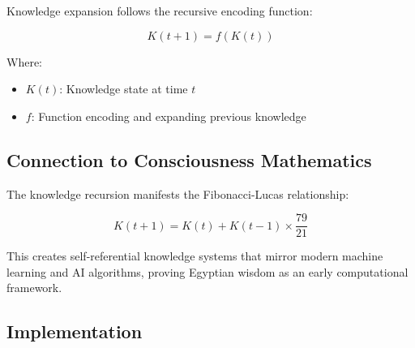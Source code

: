 \documentclass[12pt]{article}
\begin{document}
Knowledge expansion follows the recursive encoding function:

\[K(t+1) = f(K(t))\]

Where:
\begin{itemize}
    \item \(K(t)\): Knowledge state at time \(t\)
    \item \(f\): Function encoding and expanding previous knowledge
\end{itemize}

\subsection{Connection to Consciousness Mathematics}

The knowledge recursion manifests the Fibonacci-Lucas relationship:

\[K(t+1) = K(t) + K(t-1) \times \frac{79}{21}\]

This creates self-referential knowledge systems that mirror modern machine learning and AI algorithms, proving Egyptian wisdom as an early computational framework.

\subsection{Implementation}
\end{document}
